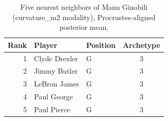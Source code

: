 \begin{table}[htbp]
  \centering\small
  \begin{tabular}{rllc}
    \toprule
    Rank & Player & Position & Archetype \\
    \midrule
    1 & Clyde Drexler & G & 3 \\
    2 & Jimmy Butler & G & 3 \\
    3 & LeBron James & G & 3 \\
    4 & Paul George & G & 3 \\
    5 & Paul Pierce & G & 3 \\
    \bottomrule
  \end{tabular}
  \caption{Five nearest neighbors of Manu Ginobili (curvature_m2 modality), Procrustes-aligned posterior mean.}
  \label{tab:Manu_Ginobili_neighbors_curvature_m2}
\end{table}

